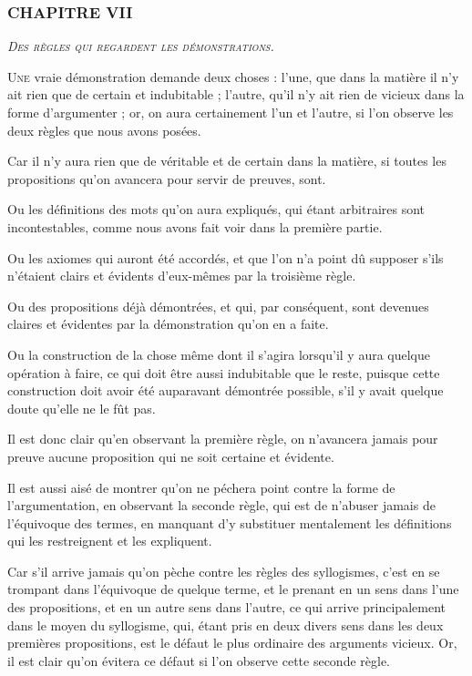\subsubsection{\centering \Large CHAPITRE VII}
\begin{center}\emph{\large\scshape Des règles qui regardent les démonstrations.}\end{center}

	\lettrine{U}{ne} vraie démonstration demande deux choses : l'une, que dans la matière il n'y ait rien que de certain et indubitable ; l'autre, qu'il n'y ait rien de vicieux dans la forme d'argumenter ; or, on aura certainement l'un et l'autre, si l'on observe les deux règles que nous avons posées.

Car il n'y aura rien que de véritable et de certain dans la matière, si toutes les propositions qu'on avancera pour servir de preuves, sont.

Ou les définitions des mots qu'on aura expliqués, qui étant arbitraires sont incontestables, comme nous avons fait voir dans la première partie.

Ou les axiomes qui auront été accordés, et que l'on n'a point dû supposer s'ils n'étaient clairs et évidents d'eux-mêmes par la troisième règle.

Ou des propositions déjà démontrées, et qui, par conséquent, sont devenues claires et évidentes par la démonstration qu'on en a faite.

Ou la construction de la chose même dont il s'agira lorsqu'il y aura quelque opération à faire, ce qui doit être aussi indubitable que le reste, puisque cette construction doit avoir été auparavant démontrée possible, s'il y avait quelque doute qu'elle ne le fût pas.

Il est donc clair qu'en observant la première règle, on n'avancera jamais pour preuve aucune proposition qui ne soit certaine et évidente.

Il est aussi aisé de montrer qu'on ne péchera point contre la forme de l'argumentation, en observant la seconde règle, qui est de n'abuser jamais de l'équivoque des termes, en manquant d'y substituer mentalement les définitions qui les restreignent et les expliquent.

Car s'il arrive jamais qu'on pèche contre les règles des syllogismes, c'est en se trompant dans l'équivoque de quelque terme, et le prenant en un sens dans l'une des propositions, et en un autre sens dans l'autre, ce qui arrive principalement dans le moyen du syllogisme, qui, étant pris en deux divers sens dans les deux premières propositions, est le défaut le plus ordinaire des arguments vicieux. Or, il est clair qu'on évitera ce défaut si l'on observe cette seconde règle.

